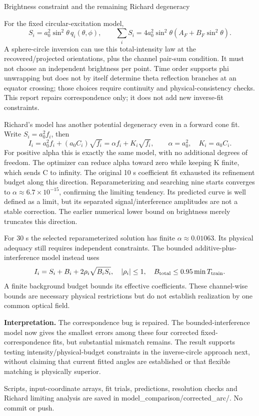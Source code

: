 \documentclass[10pt,a4paper]{article}
\begin{document}
\newpage
{\Large Brightness constraint and the remaining Richard degeneracy}

For the fixed circular-excitation model,
\[
S_i=a_0^2\sin^2\theta\,q_i(\theta,\phi),\qquad
\sum_iS_i=4a_0^2\sin^2\theta(A_F+B_F\sin^2\theta).
\]
A sphere-circle inversion can use this total-intensity law at the recovered/projected orientations, plus the channel pair-sum condition. It must not choose an independent brightness per point. Time order supports phi unwrapping but does not by itself determine theta reflection branches at an equator crossing; those choices require continuity and physical-consistency checks. This report repairs correspondence only; it does not add new inverse-fit constraints.

Richard's model has another potential degeneracy even in a forward cone fit. Write \(S_i=a_0^2 f_i\), then
\[
I_i=a_0^2f_i+(a_0C_i)\sqrt{f_i}=\alpha f_i+K_i\sqrt{f_i},
\qquad \alpha=a_0^2,\quad K_i=a_0C_i.
\]
For positive alpha this is exactly the same model, with no additional degrees of freedom. The optimizer can reduce alpha toward zero while keeping K finite, which sends C to infinity. The original 10 s coefficient fit exhausted its refinement budget along this direction. Reparameterizing and searching nine starts converges to \(\alpha\approx6.7\times10^{-15}\), confirming the limiting tendency. Its predicted curve is well defined as a limit, but its separated signal/interference amplitudes are not a stable correction. The earlier numerical lower bound on brightness merely truncates this direction.

For 30 s the selected reparameterized solution has finite \(\alpha\approx0.01063\). Its physical adequacy still requires independent constraints. The bounded additive-plus-interference model instead uses
\[
I_i=S_i+B_i+2\rho_i\sqrt{B_iS_i},\quad |\rho_i|\leq1,
\quad B_{\rm total}\leq0.95\min T_{\rm train}.
\]
A finite background budget bounds its effective coefficients. These channel-wise bounds are necessary physical restrictions but do not establish realization by one common optical field.

\textbf{Interpretation.} The correspondence bug is repaired. The bounded-interference model now gives the smallest errors among these four corrected fixed-correspondence fits, but substantial mismatch remains. The result supports testing intensity/physical-budget constraints in the inverse-circle approach next, without claiming that current fitted angles are established or that flexible matching is physically superior.

Scripts, input-coordinate arrays, fit trials, predictions, resolution checks and Richard limiting analysis are saved in model\_comparison/corrected\_arc/. No commit or push.
\end{document}
